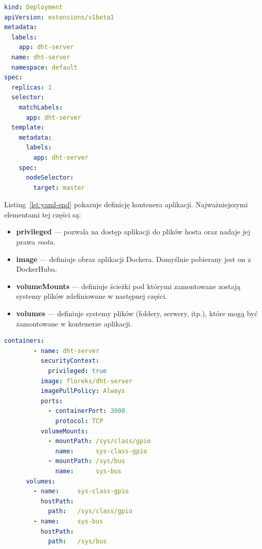 \documentclass[12pt]{report}
\begin{document}
{\begin{lstlisting}[language=yaml,caption=Definicja aplikacji uruchamianej w klastrze - część 1,label=lst:yaml-start]
kind: Deployment
apiVersion: extensions/v1beta1
metadata:
  labels:
    app: dht-server
  name: dht-server
  namespace: default
spec:
  replicas: 1
  selector:
    matchLabels:
      app: dht-server
  template:
    metadata:
      labels:
        app: dht-server
    spec:
      nodeSelector:
        target: master
\end{lstlisting}

\noindent Listing~\ref{lst:yaml-end} pokazuje definicję kontenera aplikacji. Najważniejszymi elementami tej części są:
\begin{itemize}
\item{\textbf{privileged} --- pozwala na dostęp aplikacji do plików hosta oraz nadaje jej prawa \textit{roota}.}
\item{\textbf{image} --- definiuje obraz aplikacji Dockera. Domyślnie pobierany jest on z DockerHuba.}
\item{\textbf{volumeMounts} --- definiuje ścieżki pod którymi zamontowane zostają systemy plików zdefiniowane w następnej części.}
\item{\textbf{volumes} --- definiuje systemy plików (foldery, serwery, itp.), które mogą być zamontowane w kontenerze aplikacji.}
\end{itemize}
\begin{lstlisting}[language=yaml,caption=Definicja aplikacji uruchamianej w klastrze - część 2,label=lst:yaml-end]             
      containers:
        - name: dht-server
          securityContext:
            privileged: true
          image: floreks/dht-server
          imagePullPolicy: Always
          ports:
            - containerPort: 3000
              protocol: TCP
          volumeMounts:
            - mountPath: /sys/class/gpio
              name:      sys-class-gpio
            - mountPath: /sys/bus
              name:      sys-bus
      volumes:
        - name:     sys-class-gpio
          hostPath:
            path:   /sys/class/gpio
        - name:     sys-bus
          hostPath:
            path:   /sys/bus
\end{lstlisting}

}
\end{document}
